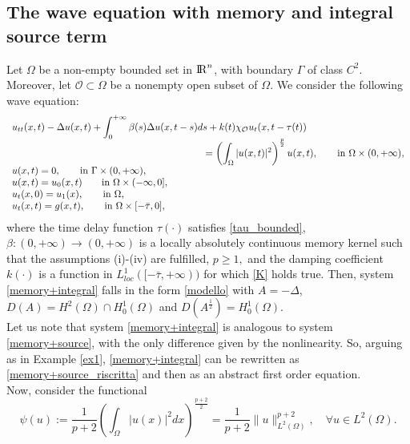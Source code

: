 \documentclass[11pt]{article}
\newcommand{\RR}{{{\rm I} \kern -.15em {\rm R} }}
\renewcommand{\geq}{\geqslant}
\begin{document}
\subsection{The wave equation with memory and integral source term}

Let $\Omega$ be a non-empty bounded set in $\RR^n$, with boundary $\Gamma$ of class $C^2$. Moreover, let $\mathcal{O}\subset \Omega$ be a nonempty open subset of $\Omega$. We consider the following wave equation:
\begin{equation}
	\label{memory+integral}
	\begin{array}{l}
		\displaystyle{u_{tt}(x,t)-\Delta u(x,t)+\int_0^{+\infty} \beta(s)\Delta u(x,t-s) ds+k(t)\chi _{\mathcal{O}} u_t(x,t-\tau(t))}\\
		\hspace{7 cm}
		\displaystyle{=\left(\int_{\Omega}|u(x,t)|^2\right)^\frac{p}{2} u(x,t), \qquad \text{in} \ \Omega \times (0,+\infty),}\\
		\displaystyle{ u(x,t)=0, \qquad \text{in} \ \Gamma \times (0,+\infty),}\\
		\displaystyle{ u(x,t)=u_0(x,t) \qquad \text{in} \ \Omega \times (-\infty,0],}\\
		\displaystyle{ u_t(x,0)=u_1(x), \qquad \text{in} \ \Omega,} \\
		\displaystyle{ u_t(x,t)=g(x,t), \qquad \text{in} \ \Omega \times [-\bar\tau,0],}
	\end{array}
\end{equation}
where the time delay function $\tau (\cdot)$ satisfies \eqref{tau_bounded}, $\beta :(0,+\infty)\rightarrow (0,+\infty)$ is a locally absolutely continuous memory kernel such that the assumptions (i)-(iv) are fulfilled, $p\geq 1,$ and the damping coefficient $k(\cdot)$ is a function in $L^1_{loc}([-\bar{\tau},+\infty))$ for which \eqref{K} holds true.
Then, system \eqref{memory+integral} falls in the form \eqref{modello} with $A=-\Delta$, $D(A)=H^2(\Omega)\cap H^1_0(\Omega)$ and $D(A^{\frac{1}{2}})= H^1_0(\Omega).$ 
\\Let us note that system \eqref{memory+integral} is analogous to system \eqref{memory+source}, with the only difference given by the nonlinearity. So, arguing as in Example \ref{ex1}, \eqref{memory+integral} can be rewritten as \eqref{memory+source_riscritta} and then as an abstract first order equation.
\\Now, consider the functional
$$
\psi (u):= \frac{1}{p +2} \left(\int_{\Omega} |u(x)|^{2}dx\right)^{\frac{p+2}{2}} =\frac{1}{p +2}\lVert u\rVert_{L^2(\Omega)}^{p+2},\quad \forall u\in L^2(\Omega).
$$
\end{document}
